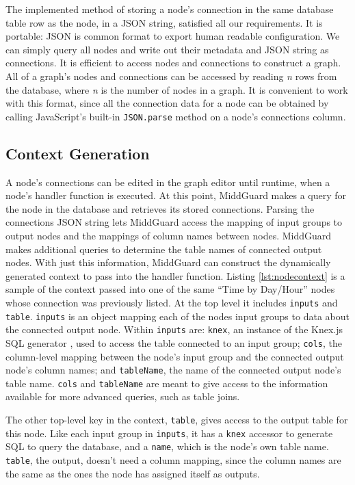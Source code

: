 \documentclass[midd]{thesis}
\begin{document}
The implemented method of storing a node's connection in the same database table
row as the node, in a JSON string, satisfied all our requirements. It is
portable: JSON is common format to export human readable configuration. We can
simply query all nodes and write out their metadata and JSON string as
connections. It is efficient to access nodes and connections to construct a
graph. All of a graph's nodes and connections can be accessed by reading
\textit{n} rows from the database, where \textit{n} is the number of nodes in a
graph. It is convenient to work with this format, since all the connection data
for a node can be obtained by calling JavaScript's built-in \texttt{JSON.parse}
method on a node's connections column.

\subsection{Context Generation}

A node's connections can be edited in the graph editor until runtime, when a
node's handler function is executed. At this point, MiddGuard makes a query for
the node in the database and retrieves its stored connections. Parsing the
connections JSON string lets MiddGuard access the mapping of input groups to
output nodes and the mappings of column names between nodes. MiddGuard makes
additional queries to determine the table names of connected output nodes. With
just this information, MiddGuard can construct the dynamically generated context
to pass into the handler function. Listing \ref{lst:nodecontext} is a sample of
the context passed into one of the same ``Time by Day/Hour'' nodes whose
connection was previously listed. At the top level it includes \texttt{inputs}
and \texttt{table}. \texttt{inputs} is an object mapping each of the nodes input
groups to data about the connected output node. Within \texttt{inputs} are:
\texttt{knex}, an instance of the Knex.js SQL generator \cite{knexjs}, used to
access the table connected to an input group; \texttt{cols}, the column-level
mapping between the node's input group and the connected output node's column
names; and \texttt{tableName}, the name of the connected output node's table
name. \texttt{cols} and \texttt{tableName} are meant to give access to the
information available for more advanced queries, such as table joins.

The other top-level key in the context, \texttt{table}, gives access to the
output table for this node. Like each input group in \texttt{inputs}, it has a
\texttt{knex} accessor to generate SQL to query the database, and a
\texttt{name}, which is the node's own table name. \texttt{table}, the output,
doesn't need a column mapping, since the column names are the same as the ones
the node has assigned itself as outputs.
\end{document}
